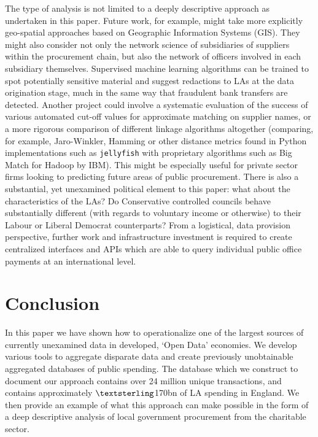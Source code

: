 \documentclass[11pt]{article}
\begin{document}
The type of analysis is not limited to a deeply descriptive approach as undertaken in this paper. Future work, for example, might take more explicitly geo-spatial approaches based on Geographic Information Systems (GIS). They might also consider not only the network science of subsidiaries of suppliers within the procurement chain, but also the network of officers involved in each subsidiary themselves. Supervised machine learning algorithms can be trained to spot potentially sensitive material and suggest redactions to LAs at the data origination stage, much in the same way that fraudulent bank transfers are detected. Another project could involve a systematic evaluation of the success of various automated cut-off values for approximate matching on supplier names, or a more rigorous comparison of different linkage algorithms altogether (comparing, for example, Jaro-Winkler, Hamming or other distance metrics found in Python implementations such as \texttt{jellyfish} with proprietary algorithms such as Big Match for Hadoop by IBM). This might be especially useful for private sector firms looking to predicting future areas of public procurement. There is also a substantial, yet unexamined political element to this paper: what about the characteristics of the LAs? Do Conservative controlled councils behave substantially different (with regards to voluntary income or otherwise) to their Labour or Liberal Democrat counterparts? From a logistical, data provision perspective, further work and infrastructure investment is required to create centralized interfaces and APIs which are able to query individual public office payments at an international level.

\section{Conclusion}\label{conclusion}

In this paper we have shown how to operationalize one of the largest sources of currently unexamined data in developed, `Open Data’ economies. We develop various tools to aggregate disparate data and create previously unobtainable aggregated databases of public spending. The database which we construct to document our approach contains over 24 million unique transactions, and contains approximately $\textsterling$170bn of LA spending in England. We then provide an example of what this approach can make possible in the form of a deep descriptive analysis of local government procurement from the charitable sector. 
\end{document}
